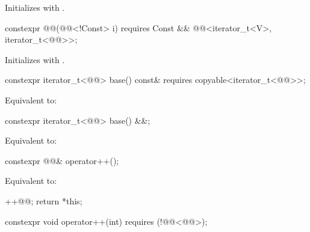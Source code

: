 \begin{itemdescr}
\pnum
\effects
Initializes  with .
\end{itemdescr}

%
\begin{itemdecl}
constexpr @@(@@<!Const> i)
  requires Const && @@<iterator_t<V>, iterator_t<@@>>;
\end{itemdecl}

\begin{itemdescr}
\pnum
\effects
Initializes  with .
\end{itemdescr}

%
\begin{itemdecl}
constexpr iterator_t<@@> base() const&
  requires copyable<iterator_t<@@>>;
\end{itemdecl}

\begin{itemdescr}
\pnum
\effects
Equivalent to: 
\end{itemdescr}

%
\begin{itemdecl}
constexpr iterator_t<@@> base() &&;
\end{itemdecl}

\begin{itemdescr}
\pnum
\effects
Equivalent to: 
\end{itemdescr}

%
\begin{itemdecl}
constexpr @@& operator++();
\end{itemdecl}

\begin{itemdescr}
\pnum
\effects
Equivalent to:
\begin{codeblock}
++@@;
return *this;
\end{codeblock}
\end{itemdescr}

%
\begin{itemdecl}
constexpr void operator++(int) requires (!@@<@@>);
\end{itemdecl}

